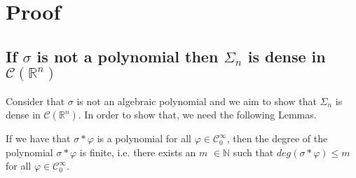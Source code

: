 \documentclass[../main.tex]{subfiles}
\begin{document}
	\section{Proof}
	\subsection{If $\sigma$ is not a polynomial then $\Sigma_n$ is dense in $\mathcal{C}(\mathbb{R}^n)$ }
	\noindent Consider that $\sigma$ is not an algebraic polynomial and we aim to show that $\Sigma_n$ is dense in $\mathcal{C}(\mathbb{R}^n)$. In order to show that, we need the following Lemmas. \\ 
	\begin{lema}  %
		If we have that $\sigma \ast \varphi $ is a polynomial for all $\varphi \in \mathcal{C}^\infty_0 $, then the degree of the polynomial $\sigma \ast \varphi $ is finite, i.e. there exists an $m$ $\in \mathbb{N}$ such that $ deg (\sigma \ast \varphi) \leq m$ for all $\varphi \in \mathcal{C}^\infty_0$. 
	\end{lema}
\end{document}
